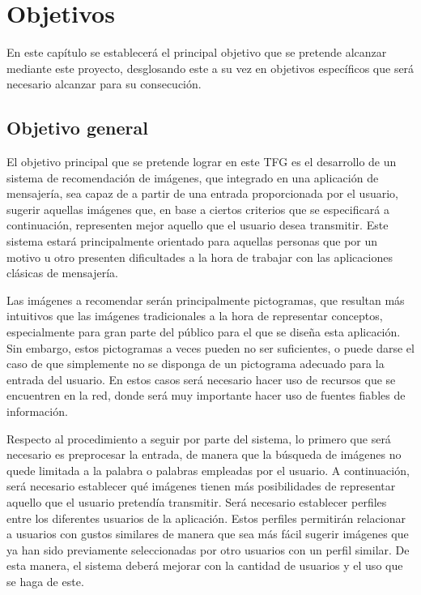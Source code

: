 \chapter{Objetivos}
\label{chap:objetivos}

\noindent
En este capítulo se establecerá el principal objetivo que se pretende alcanzar mediante este proyecto, desglosando este a su vez en objetivos específicos que será necesario alcanzar para su consecución.

\section{Objetivo general}

El objetivo principal que se pretende lograr en este \ac{TFG} es el desarrollo de un sistema de recomendación de imágenes, que integrado en una aplicación de mensajería, sea capaz de a partir de una entrada proporcionada por el usuario, sugerir aquellas imágenes que, en base a ciertos criterios que se especificará a continuación, representen mejor aquello que el usuario desea transmitir. Este sistema estará principalmente orientado para aquellas personas que por un motivo u otro presenten dificultades a la hora de trabajar con las aplicaciones clásicas de mensajería.

Las imágenes a recomendar serán principalmente pictogramas, que resultan más intuitivos que las imágenes tradicionales a la hora de representar conceptos, especialmente para gran parte del público para el que se diseña esta aplicación. Sin embargo, estos pictogramas a veces pueden no ser suficientes, o puede darse el caso de que simplemente no se disponga de un pictograma adecuado para la entrada del usuario. En estos casos será necesario hacer uso de recursos que se encuentren en la red, donde será muy importante hacer uso de fuentes fiables de información.

Respecto al procedimiento a seguir por parte del sistema, lo primero que será necesario es preprocesar la entrada, de manera que la búsqueda de imágenes no quede limitada a la palabra o palabras empleadas por el usuario. A continuación, será necesario establecer qué imágenes tienen más posibilidades de representar aquello que el usuario pretendía transmitir. Será necesario establecer perfiles entre los diferentes usuarios de la aplicación. Estos perfiles permitirán relacionar a usuarios con gustos similares de manera que sea más fácil sugerir imágenes que ya han sido previamente seleccionadas por otro usuarios con un perfil similar. De esta manera, el sistema deberá mejorar con la cantidad de usuarios y el uso que se haga de este.

